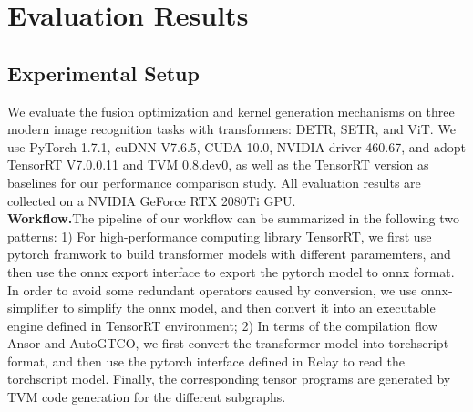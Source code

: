 
\section{Evaluation Results}
\subsection{Experimental Setup}

We evaluate the fusion optimization and kernel generation mechanisms on three modern image recognition tasks with transformers: DETR, SETR, and ViT. %
We use PyTorch 1.7.1, cuDNN V7.6.5, CUDA 10.0, NVIDIA driver 460.67, and adopt TensorRT V7.0.0.11 and TVM 0.8.dev0, as well as the TensorRT version as baselines for our performance comparison study. All evaluation results are collected on a NVIDIA GeForce RTX 2080Ti GPU. \\
\textbf{Workflow.}The pipeline of our workflow can be summarized in the following two patterns: 1) For high-performance computing library TensorRT, we first use pytorch framwork to build transformer models 
with different paramemters, and then use the onnx export interface to export the pytorch model to onnx format. In order to avoid some redundant operators caused by conversion, we use onnx-simplifier to simplify the onnx model, and then convert it into an executable engine defined in TensorRT environment;
2) In terms of the compilation flow Ansor and AutoGTCO, we first convert the transformer model into torchscript format, and then use the pytorch interface defined in Relay to read the torchscript model. Finally, the corresponding tensor programs are generated by TVM code generation for the different subgraphs.







